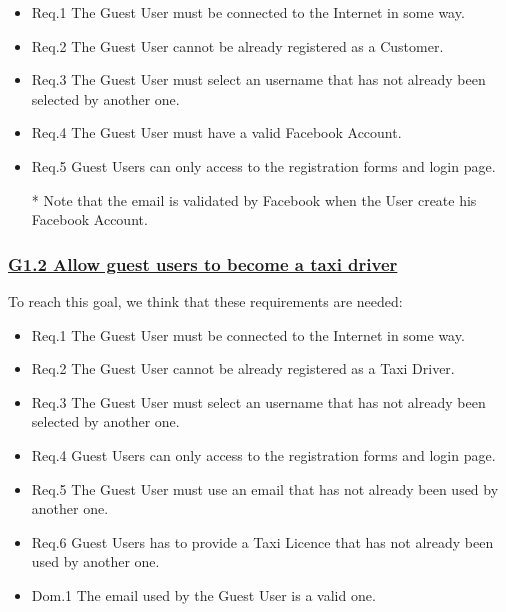 \documentclass{report}
\begin{document}
				\begin{itemize}
					\item \lbrack Req.1\rbrack \label{sec:fr1_g1_1_2} The Guest User must be connected to the Internet in some way.
					\item \lbrack Req.2\rbrack \label{sec:fr2_g1_1_2} The Guest User cannot be already registered as a Customer.
					\item \lbrack Req.3\rbrack \label{sec:fr3_g1_1_2} The Guest User must select an username that has not already been selected by another one.
					\item \lbrack Req.4\rbrack \label{sec:fr4_g1_1_2} The Guest User must have a valid Facebook Account.
					\item \lbrack Req.5\rbrack \label{sec:fr5_g1_1_2} Guest Users can only access to the registration forms and login page.
					
					* Note that the email is validated by Facebook when the User create his Facebook Account.
				\end{itemize}

			\subsubsection{\lbrack \hyperref[sec:g1_2]{G1.2 Allow guest users to become a taxi driver}\rbrack}
			To reach this goal, we think that these requirements are needed:

				\begin{itemize}
					\item \lbrack Req.1\rbrack \label{sec:fr1_g1_2} The Guest User must be connected to the Internet in some way.
					\item \lbrack Req.2\rbrack \label{sec:fr2_g1_2} The Guest User cannot be already registered as a Taxi Driver.
					\item \lbrack Req.3\rbrack \label{sec:fr3_g1_2} The Guest User must select an username that has not already been selected by another one.
					\item \lbrack Req.4\rbrack \label{sec:fr4_g1_2} Guest Users can only access to the registration forms and login page.
					\item \lbrack Req.5\rbrack \label{sec:fr5_g1_2} The Guest User must use an email that has not already been used by another one.
					\item \lbrack Req.6\rbrack \label{sec:fr6_g1_2} Guest Users has to provide a Taxi Licence that has not already been used by another one.
					\item \lbrack Dom.1\rbrack \label{sec:da1_g1_2} The email used by the Guest User is a valid one.
				\end{itemize}
\end{document}
